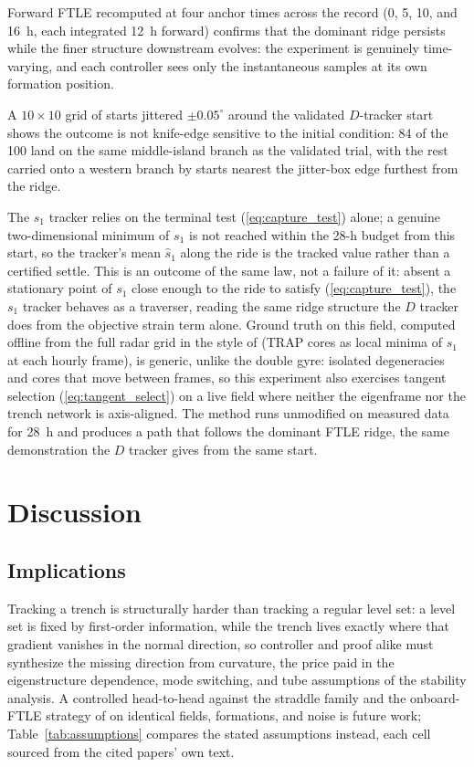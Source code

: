 \documentclass[lettersize,journal]{IEEEtran}
\begin{document}
Forward FTLE recomputed at four anchor times across the record (0, 5,
10, and 16~h, each integrated 12~h forward) confirms that the dominant
ridge persists while the finer structure downstream evolves: the
experiment is genuinely time-varying, and each controller sees only the
instantaneous samples at its own formation position.

A $10 \times 10$ grid of starts jittered $\pm 0.05^{\circ}$ around the
validated $D$-tracker start shows the outcome is not knife-edge
sensitive to the initial condition: 84 of the 100 land on the same
middle-island branch as the validated trial, with the rest carried onto
a western branch by starts nearest the jitter-box edge furthest from
the ridge.

The $s_1$ tracker relies on the terminal test (\ref{eq:capture_test})
alone; a genuine two-dimensional minimum of $s_1$ is not reached within
the 28-h budget from this start, so the tracker's mean $\hat{s}_1$
along the ride is the tracked value rather than a certified settle.
This is an outcome of the same law, not a failure of it: absent a
stationary point of $s_1$ close enough to the ride to satisfy
(\ref{eq:capture_test}), the $s_1$ tracker behaves as a traverser,
reading the same ridge structure the $D$ tracker does from the
objective strain term alone. Ground truth on this field, computed
offline from the full radar grid in the style of \cite{17,36} (TRAP
cores as local minima of $s_1$ at each hourly frame), is generic,
unlike the double gyre: isolated degeneracies and cores that move
between frames, so this experiment also exercises tangent selection
(\ref{eq:tangent_select}) on a live field where neither the eigenframe
nor the trench network is axis-aligned. The method runs unmodified on
measured data for 28~h and produces a path that follows the dominant
FTLE ridge, the same demonstration the $D$ tracker gives from the same
start.

\section{Discussion}
\label{sec:discussion}

\subsection{Implications}
\label{sec:prior_comparison}

Tracking a trench is structurally harder than tracking a regular level
set: a level set is fixed by first-order information, while the trench
lives exactly where that gradient vanishes in the normal direction, so
controller and proof alike must synthesize the missing direction from
curvature, the price paid in the eigenstructure dependence, mode
switching, and tube assumptions of the stability analysis. A
controlled head-to-head against the straddle family \cite{9,10,11} and
the onboard-FTLE strategy of \cite{13} on identical fields, formations,
and noise is future work; Table~\ref{tab:assumptions} compares the
stated assumptions instead, each cell sourced from the cited papers'
own text.
\end{document}
